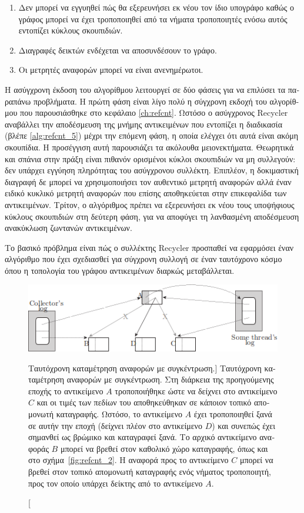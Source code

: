 \begin{greek}
\begin{enumerate}
\item Δεν μπορεί να εγγυηθεί πώς θα εξερευνήσει εκ νέου τον
  ίδιο υπογράφο καθώς ο γράφος μπορεί να έχει τροποποιηθεί
  από τα νήματα τροποποιητές ενόσω αυτός εντοπίζει κύκλους
  σκουπιδιών.
\item Διαγραφές δεικτών ενδέχεται να αποσυνδέσουν το γράφο.
\item Οι μετρητές αναφορών μπορεί να είναι ανενημέρωτοι.
\end{enumerate}

Η ασύγχρονη έκδοση του αλγορίθμου λειτουργεί σε δύο φάσεις
για να επιλύσει τα παραπάνω προβλήματα. Η πρώτη φάση είναι
λίγο πολύ η σύγχρονη εκδοχή του αλγορίθμου που παρουσιάσθηκε
στο κεφάλαιο \ref{ch:refcnt}. Ωστόσο ο ασύγχρονος Recycler
αναβάλλει την αποδέσμευση της μνήμης αντικειμένων που
εντοπίζει η διαδικασία  (βλέπε
\ref{alg:refcnt_5}) μέχρι την επόμενη φάση, η οποία ελέγχει
ότι αυτά είναι ακόμη σκουπίδια. Η προσέγγιση αυτή παρουσιάζει
τα ακόλουθα μειονεκτήματα. Θεωρητικά και σπάνια στην πράξη
είναι πιθανόν ορισμένοι κύκλοι σκουπιδιών να μη συλλεγούν:
δεν υπάρχει εγγύηση πληρότητας του ασύγχρονου συλλέκτη.
Επιπλέον, η δοκιμαστική διαγραφή δε μπορεί να χρησιμοποιήσει
τον αυθεντικό μετρητή αναφορών αλλά έναν ειδικό κυκλικό
μετρητή αναφορών που επίσης αποθηκεύεται στην επικεφαλίδα
των αντικειμένων. Τρίτον, ο αλγόριθμος πρέπει να εξερευνήσει
εκ νέου τους υποψήφιους κύκλους σκουπιδιών στη δεύτερη φάση,
για να αποφύγει τη λανθασμένη αποδέσμευση ανακύκλωση ζωντανών
αντικειμένων.

Το βασικό πρόβλημα είναι πώς ο συλλέκτης Recycler προσπαθεί
να εφαρμόσει έναν αλγόριθμο που έχει σχεδιασθεί για σύγχρονη
συλλογή σε έναν ταυτόχρονο κόσμο όπου η τοπολογία του γράφου
αντικειμένων διαρκώς μεταβάλλεται.

\begin{figure}[H]
  \centering
  \includegraphics{figures/conc_4}
  \caption
    [Ταυτόχρονη καταμέτρηση αναφορών με συγκέντρωση.]
    {Ταυτόχρονη καταμέτρηση αναφορών με συγκέντρωση. Στη
     διάρκεια της προηγούμενης εποχής το αντικείμενο $A$
     τροποποιήθηκε ώστε να δείχνει στο αντικείμενο $C$
     και οι τιμές των πεδίων του αποθηκεύθηκαν σε κάποιον
     τοπικό απομονωτή καταγραφής. Ωστόσο, το αντικείμενο
     $A$ έχει τροποποιηθεί ξανά σε αυτήν την εποχή (δείχνει
     πλέον στο αντικείμενο $D$) και συνεπώς έχει σημανθεί
     ως βρώμικο και καταγραφεί ξανά. Το αρχικό αντικείμενο
     αναφοράς $B$ μπορεί να βρεθεί στον καθολικό χώρο
     καταγραφής, όπως και στο σχήμα~\ref{fig:refcnt_2}. Η
     αναφορά προς το αντικείμενο $C$ μπορεί να βρεθεί στον
     τοπικό απομονωτή καταγραφής ενός νήματος τροποποιητή,
     προς τον οποίο υπάρχει δείκτης από το αντικείμενο
     $A$.} 
\end{figure}


\end{greek}
